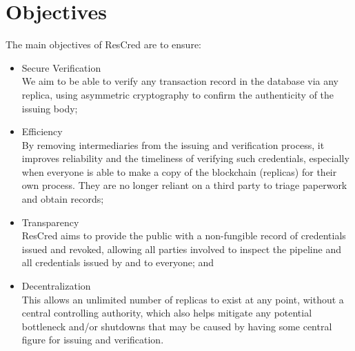 \section{Objectives}
The main objectives of ResCred are to ensure:
\begin{itemize}
    \item Secure Verification \\
        We aim to be able to verify any transaction record in the database via any replica, using
        asymmetric cryptography to confirm the authenticity of the issuing body;
    \item Efficiency \\
        By removing intermediaries from the issuing and verification process, it improves
        reliability and the timeliness of verifying such credentials, especially when everyone is
        able to make a copy of the blockchain (replicas) for their own process. They are no longer
        reliant on a third party to triage paperwork and obtain records;
    \item Transparency \\
        ResCred aims to provide the public with a non-fungible record of credentials issued and
        revoked, allowing all parties involved to inspect the pipeline and all credentials issued by
        and to everyone; and
    \item Decentralization \\
        This allows an unlimited number of replicas to exist at any point, without a central
        controlling authority, which also helps mitigate any potential bottleneck and/or shutdowns
        that may be caused by having some central figure for issuing and verification.
\end{itemize}

